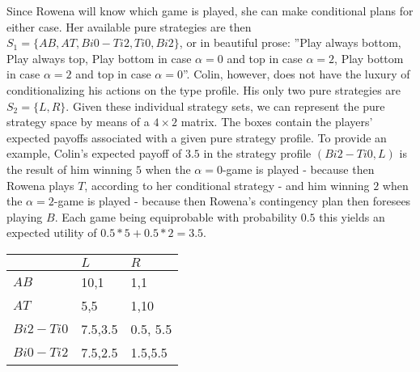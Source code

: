 \documentclass[10pt,a4paper]{article}
\begin{document}
Since Rowena will know which game is played, she can make conditional plans for either case. Her available pure strategies are then $S_1=\{AB,AT,Bi0-Ti2,Ti0,Bi2\}$, or in beautiful prose: ''Play always bottom, Play always top, Play bottom in case $\alpha=0$ and top in case $\alpha=2$, Play bottom in case $\alpha=2$ and top in case $\alpha=0$''. Colin, however, does not have the luxury of conditionalizing his actions on the type profile. His only two pure strategies are $S_2=\{L,R\}$. Given these individual strategy sets, we can represent the pure strategy space by means of a $4\times 2$ matrix. The boxes contain the players' expected payoffs associated with a given pure strategy profile. To provide an example, Colin's expected payoff of $3.5$ in the strategy profile $(Bi2-Ti0,L)$ is the result of him winning $5$ when the $\alpha=0$-game is played - because then Rowena plays $T$, according to her conditional strategy - and him winning $2$ when the $\alpha=2$-game is played - because then Rowena's contingency plan then foresees playing $B$. Each game being equiprobable with probability $0.5$ this yields an expected utility of $0.5*5+0.5*2=3.5$.
\begin{table}[h]
\centering
\begin{tabular}[l]{|l|l|l|}
\hline
          & $L$ & $R$  \\ \hline
$AB$     & 10,1   & 1,1 \\ \hline
$AT$		& 5,5	& 1,10 \\ \hline
$Bi2-Ti0$	& 7.5,3.5 & 0.5, 5.5 \\ \hline
$Bi0-Ti2$	& 7.5,2.5	& 1.5,5.5
\end{tabular}
\end{table}




 
\end{document}
